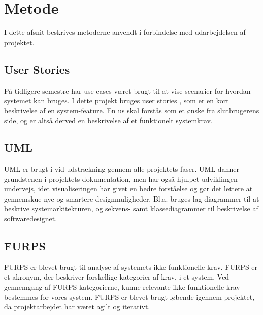 \chapter{Metode}
I dette afsnit beskrives metoderne anvendt i forbindelse med udarbejdelsen af projektet.

\section{User Stories}
På tidligere semestre har use cases været brugt til at vise scenarier for hvordan systemet kan bruges. I dette projekt bruges user stories \cite{margaretrouse2015}, som er en kort beskrivelse af en system-feature. En \gls{us} skal forstås som et ønske fra slutbrugerens side, og er altså derved en beskrivelse af et funktionelt systemkrav.

\section{UML}
UML er brugt i vid udstrækning gennem alle projektets faser. UML danner grundstenen i projektets dokumentation, men har også hjulpet udviklingen undervejs, idet visualiseringen har givet en bedre forståelse og gør det lettere at gennemskue nye og smartere designmuligheder. Bl.a. bruges lag-diagrammer til at beskrive systemarkitekturen, og sekvens- samt klassediagrammer til beskrivelse af softwaredesignet.

\section{FURPS}
FURPS er blevet brugt til analyse af systemets ikke-funktionelle krav. FURPS er et akronym, der beskriver forskellige kategorier af krav, i et system. Ved gennemgang af FURPS kategorierne, kunne relevante ikke-funktionelle krav bestemmes for vores system. FURPS er blevet brugt løbende igennem projektet, da projektarbejdet har været agilt og iterativt.